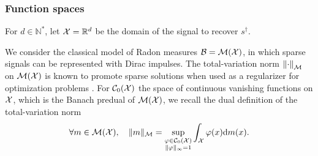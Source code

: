 \documentclass[12pt]{article}
\begin{document}


        \subsubsection{Function spaces}
            For $d \in \mathbb{N}^*$, let $\mathcal{X} = \mathbb{R}^d$ be the domain of the signal to recover $s^\dagger$. 

            We consider the classical model of Radon measures $\mathcal{B} = {\mathcal{M}}({\mathcal{X}})$, in which sparse signals can be represented with Dirac impulses. The {total-variation norm} $\left\lVert\cdot\right\rVert_\mathcal{M}$ on ${\mathcal{M}}({\mathcal{X}})$ is known to promote sparse solutions when used as a regularizer for optimization problems \cite{unser2017splines}. For ${\mathcal{C}}_0({\mathcal{X}})$ the space of continuous vanishing functions on $\mathcal{X}$, which is the Banach predual of ${\mathcal{M}}({\mathcal{X}})$, we recall the dual definition of the total-variation norm
            \begin{equation*}
                \forall m \in {\mathcal{M}}({\mathcal{X}}), \quad \lVert m \rVert_\mathcal{M} = \underset{\substack{\varphi \in {\mathcal{C}}_0({\mathcal{X}}) \\ \| \varphi \|_\infty = 1}}{\sup} \int_{\mathcal{X}} \varphi(x) \mathrm{d}m(x).
            \end{equation*}
            
\end{document}
